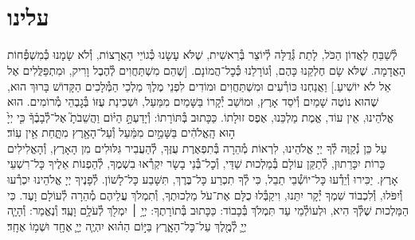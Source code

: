 \documentclass[twoside, openany, parskip=half, 11pt]{book}
\begin{document}
\uvaletzion

\\
\\


\label{end of shacharis}
\fullkaddish

\section*{ עלינו }

\newcommand{\aleinu}{
\firstword{עָלֵֽינוּ}
לְ֯שַׁבֵּחַ לַאֲדוֹן הַכֹּל, לָתֵת גְּ֯דֻלָּה לְ֯יוֹצֵר בְּ֯רֵאשִׁית, שֶׁלֹּא עָשָׂנוּ כְּ֯גוֹיֵי הָאֲרָצוֹת, וְ֯לֹא שָׂמָנוּ כְּ֯מִשְׁפְּ֯חוֹת הָאֲדָמָה. שֶׁלֹּא שָׂם חֶלְקֵנוּ כָּהֶם, וְ֯גוֹרָלֵנוּ כְּ֯כׇל־הֲמוֹנָם. [שֶׁהֵם מִשְׁתַּחֲוִים לְ֯הֶבֶל וָרִיק, וּמִתְפַּלֲּלִים אֶל אֵל לֹא יוֹשִׁיעַ.] וַאֲנַחְנוּ כּוֹרְ֯עִים וּמִשְׁתַּחֲוִים וּמוֹדִים לִפְנֵי מֶלֶךְ מַלְכֵי הַמְּ֯לָכִים הַקָּדוֹשׁ בָּרוּךְ הוּא, שֶׁהוּא נוֹטֶה שָׁמַיִם וְ֯יֹסֵד אָרֶץ, וּמוֹשַׁב יְ֯קָרוֹ בַּשָּׁמַיִם מִמַּעַל, וּשְׁכִינַת עֻזּוֹ בְּ֯גׇבְהֵי מְ֯רוֹמִים. הוּא אֱלֹהֵינוּ, אֵין עוֹד, אֱמֶת מַלְכֵּנוּ, אֶפֶס זוּלָתוֹ. כַּכָּתוּב בְּ֯תּוֹרָתוֹ: וְ֯יָדַעְתָּ֣
\source{דברים ד}
הַיּ֗וֹם וַהֲשֵׁבֹתָ֮ אֶל־לְ֯בָבֶ֒ךָ֒ כִּ֤י יְיָ֙ ה֣וּא הָֽאֱלֹהִ֔ים בַּשָּׁמַ֣יִם מִמַּ֔עַל וְ֯עַל־הָאָ֖רֶץ מִתָּ֑חַת אֵ֖ין עֽוֹד׃\\
עַל כֵּן נְ֯קַוֶּה לְ֯ךָ יְיָ אֱלֹהֵינוּ, לִרְאוֹת מְ֯הֵרָה בְּ֯תִפְאֶרֶת עֻזֶּךָ, לְ֯הַעֲבִיר גִּלּוּלִים מִן הָאָרֶץ, וְ֯הָאֱלִילִים כָּרוֹת יִכָּרֵתוּן, לְ֯תַקֵּן עוֹלָם בְּ֯מַלְכוּת שַׁדַּי, וְ֯כׇל־בְּ֯נֵי בָשָׂר יִקְרְ֯אוּ בִשְׁמֶךָ, לְ֯הַפְנוֹת אֵלֶיךָ כָּל־רִשְׁעֵי אָרֶץ. יַכִּירוּ וְ֯יֵדְ֯עוּ כָּל־יוֹשְׁ֯בֵי תֵבֵל, כִּי לְ֯ךָ תִכְרַע כָּל־בֶּרֶךְ, תִּשָּׁבַע כָּל־לָשׁוֹן. לְ֯פָנֶיךָ יְיָ אֱלֹהֵינוּ יִכְרְ֯עוּ וְ֯יִפֹּלוּ, וְ֯לִכְבוֹד שִׁמְךָ יְ֯קָר יִתֵּנוּ, וִיקַבְּ֯לוּ כֻלָּם אֶת־עֹל מַלְכוּתֶךָ, וְ֯תִמְלֹךְ עֲלֵיהֶם מְ֯הֵרָה לְ֯עוֹלָם וָעֶד. כִּי הַמַּלְכוּת שֶׁלְּ֯ךָ הִיא, וּלְעוֹלְ֯מֵי עַד תִּמְלֹךְ בְּ֯כָבוֹד: כַּכָּתוּב בְּ֯תוֹרָתֶךָ:\source{שמות טו} יְיָ֥ ׀ יִמְלֹ֖ךְ לְ֯עֹלָ֥ם וָעֶֽד׃ וְ֯נֶאֱמַר:\source{זכריה יד} וְ֯הָיָ֧ה יְיָ֛ לְ֯מֶ֖לֶךְ עַל־כׇּל־הָאָ֑רֶץ בַּיּ֣וֹם הַה֗וּא יִהְיֶ֧ה יְיָ֛ אֶחָ֖ד וּשְׁמ֥וֹ אֶחָֽד׃
}

\aleinu
\end{document}
